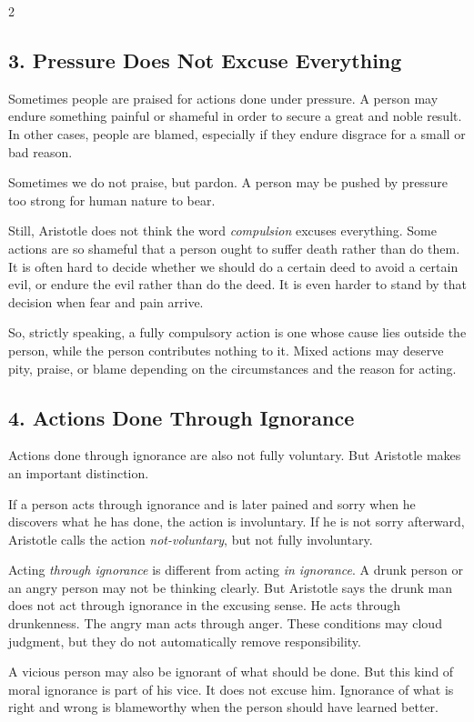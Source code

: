 \documentclass[12pt]{article}
\begin{document}
\begin{multicols}{2}
\subsection*{3. Pressure Does Not Excuse Everything}
Sometimes people are praised for actions done under pressure. A person may endure something painful or shameful in order to secure a great and noble result. In other cases, people are blamed, especially if they endure disgrace for a small or bad reason.

Sometimes we do not praise, but pardon. A person may be pushed by pressure too strong for human nature to bear.

Still, Aristotle does not think the word \textit{compulsion} excuses everything. Some actions are so shameful that a person ought to suffer death rather than do them. It is often hard to decide whether we should do a certain deed to avoid a certain evil, or endure the evil rather than do the deed. It is even harder to stand by that decision when fear and pain arrive.

So, strictly speaking, a fully compulsory action is one whose cause lies outside the person, while the person contributes nothing to it. Mixed actions may deserve pity, praise, or blame depending on the circumstances and the reason for acting.

\subsection*{4. Actions Done Through Ignorance}
Actions done through ignorance are also not fully voluntary. But Aristotle makes an important distinction.

If a person acts through ignorance and is later pained and sorry when he discovers what he has done, the action is involuntary. If he is not sorry afterward, Aristotle calls the action \textit{not-voluntary}, but not fully involuntary.

Acting \textit{through ignorance} is different from acting \textit{in ignorance}. A drunk person or an angry person may not be thinking clearly. But Aristotle says the drunk man does not act through ignorance in the excusing sense. He acts through drunkenness. The angry man acts through anger. These conditions may cloud judgment, but they do not automatically remove responsibility.

A vicious person may also be ignorant of what should be done. But this kind of moral ignorance is part of his vice. It does not excuse him. Ignorance of what is right and wrong is blameworthy when the person should have learned better.


\end{multicols}
\end{document}
